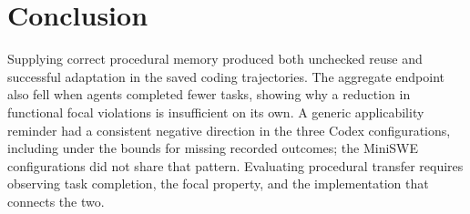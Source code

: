 \section{Conclusion}
Supplying correct procedural memory produced both unchecked reuse and successful adaptation in the saved coding trajectories. The aggregate endpoint also fell when agents completed fewer tasks, showing why a reduction in functional focal violations is insufficient on its own. A generic applicability reminder had a consistent negative direction in the three Codex configurations, including under the bounds for missing recorded outcomes; the MiniSWE configurations did not share that pattern. Evaluating procedural transfer requires observing task completion, the focal property, and the implementation that connects the two.
